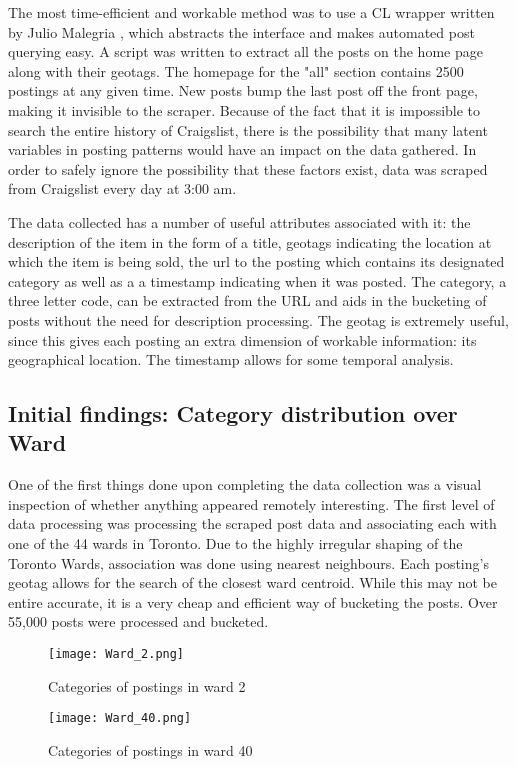 \documentclass[12pt]{article}
\begin{document}
The most time-efficient and workable method was to use a CL wrapper written by Julio Malegria \cite{clwrapper}, which abstracts the interface and makes automated post querying easy. A script was written to extract all the posts on the home page along with their geotags. The homepage for the "all" section contains 2500 postings at any given time. New posts bump the last post off the front page, making it invisible to the scraper. Because of the fact that it is impossible to search the entire history of Craigslist, there is the possibility that many latent variables in posting patterns would have an impact on the data gathered. In order to safely ignore the possibility that these factors exist, data was scraped from Craigslist every day at 3:00 am. 

The data collected has a number of useful attributes associated with it: the description of the item in the form of a title, geotags indicating the location at which the item is being sold, the url to the posting which contains its designated category as well as a a timestamp indicating when it was posted. The category, a three letter code, can be extracted from the URL and aids in the bucketing of posts without the need for description processing. The geotag is extremely useful, since this gives each posting an extra dimension of workable information: its geographical location. The timestamp allows for some temporal analysis. 

\subsection{Initial findings: Category distribution over Ward}
One of the first things done upon completing the data collection was a visual inspection of whether anything appeared remotely interesting. The first level of data processing was processing the scraped post data and associating each with one of the 44 wards in Toronto. Due to the highly irregular shaping of the Toronto Wards, association was done using nearest neighbours. Each posting's geotag allows for the search of the closest ward centroid. While this may not be entire accurate, it is a very cheap and efficient way of bucketing the posts. Over 55,000 posts were processed and bucketed.

\begin{figure}[h]
\centering
\texttt{[image: Ward\_2.png]}
\caption{Categories of postings in ward 2}
\end{figure}

\begin{figure}[h]
\centering
\texttt{[image: Ward\_40.png]}
\caption{Categories of postings in ward 40}
\end{figure}
\end{document}
